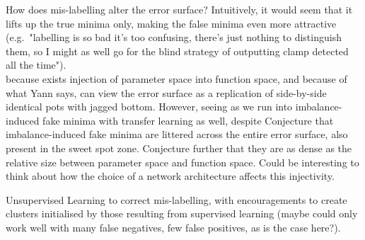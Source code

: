 \documentclass[a4paper,11pt]{article}
\begin{document}
How does mis-labelling alter the error surface? Intuitively, it would seem that it lifts up the true minima only, making the false minima even more attractive (e.g.\ "labelling is so bad it's too confusing, there's just nothing to distinguish them, so I might as well go for the blind strategy of outputting clamp detected all the time"). \\

because exists injection of parameter space into function space, and because of what Yann says, can view the error surface as a replication of side-by-side identical pots with jagged bottom. However, seeing as we run into imbalance-induced fake minima with transfer learning as well, despite
Conjecture that imbalance-induced fake minima are littered across the entire error surface, also present in the sweet spot zone. Conjecture further that they are as dense as the relative size between parameter space and function space. Could be interesting to think about how the choice of a network architecture affects this injectivity.

Unsupervised Learning to correct mis-labelling, with encouragements to create clusters initialised by those resulting from supervised learning (maybe could only work well with many false negatives, few false positives, as is the case here?). \\ 
\end{document}
